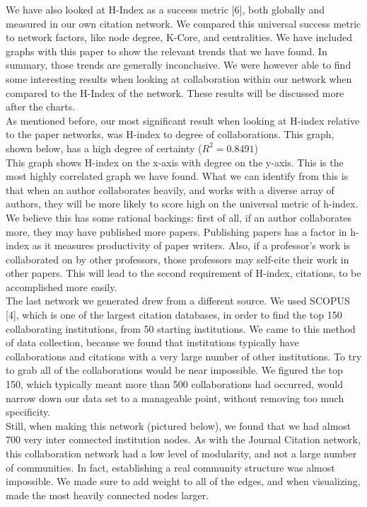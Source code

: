 \documentclass[times, 10pt,twocolumn]{article}
\begin{document}
We have also looked at H-Index as a success metric [6], both globally and measured in our own citation network. We compared this universal success metric to network factors, like node degree, K-Core, and centralities. We have included graphs with this paper to show the relevant trends that we have found. In summary, those trends are generally inconclusive. We were however able to find some interesting results when looking at collaboration within our network when compared to the H-Index of the network. These results will be discussed more after the charts. \\

As mentioned before, our most significant result when looking at H-index relative to the paper networks, was H-index to degree of collaborations. This graph, shown below, has a high degree of certainty ($R^2 = 0.8491$)  \\

This graph shows H-index on the x-axis with degree on the y-axis. This is the most highly correlated graph we have found. What we can identify from this is that when an author collaborates heavily, and works with a diverse array of authors, they will be more likely to score high on the universal metric of h-index. \\

We believe this has some rational backings: first of all, if an author collaborates more, they may have published more papers. Publishing papers has a factor in h-index as it measures productivity of paper writers. Also, if a professor’s work is collaborated on by other professors, those professors may self-cite their work in other papers. This will lead to the second requirement of H-index, citations, to be accomplished more easily. \\

The last network we generated drew from a different source. We used SCOPUS [4], which is one of the largest citation databases, in order to find the top 150 collaborating institutions, from 50 starting institutions. We came to this method of data collection, because we found that institutions typically have collaborations and citations with a very large number of other institutions. To try to grab all of the collaborations would be near impossible. We figured the top 150, which typically meant more than 500 collaborations had occurred, would narrow down our data set to a manageable point, without removing too much specificity. \\

Still, when making this network (pictured below), we found that we had almost 700 very inter connected institution nodes. As with the Journal Citation network, this collaboration network had a low level of modularity, and not a large number of communities. In fact, establishing a real community structure was almost impossible. We made sure to add weight to all of the edges, and when visualizing, made the most heavily connected nodes larger. \\
\end{document}
